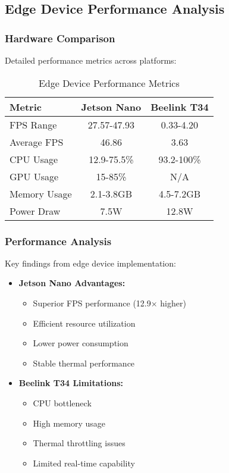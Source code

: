 \subsection{Edge Device Performance Analysis}

\subsubsection{Hardware Comparison}
Detailed performance metrics across platforms:

\begin{table}[htbp]
  \centering
  \caption{Edge Device Performance Metrics}
  \label{tab:edge_comparison}
  \begin{tabular}{|l|c|c|}
    \hline
    \rowcolor[HTML]{C0C0C0}
    \textbf{Metric} & \textbf{Jetson Nano} & \textbf{Beelink T34} \\
    \hline
    FPS Range & 27.57-47.93 & 0.33-4.20 \\
    \hline
    Average FPS & 46.86 & 3.63 \\
    \hline
    CPU Usage & 12.9-75.5\% & 93.2-100\% \\
    \hline
    GPU Usage & 15-85\% & N/A \\
    \hline
    Memory Usage & 2.1-3.8GB & 4.5-7.2GB \\
    \hline
    Power Draw & 7.5W & 12.8W \\
    \hline
  \end{tabular}
\end{table}

\subsubsection{Performance Analysis}
Key findings from edge device implementation:

\begin{itemize}
  \item \textbf{Jetson Nano Advantages:}
  \begin{itemize}
    \item Superior FPS performance (12.9× higher)
    \item Efficient resource utilization
    \item Lower power consumption
    \item Stable thermal performance
  \end{itemize}
  
  \item \textbf{Beelink T34 Limitations:}
  \begin{itemize}
    \item CPU bottleneck
    \item High memory usage
    \item Thermal throttling issues
    \item Limited real-time capability
  \end{itemize}
\end{itemize}

